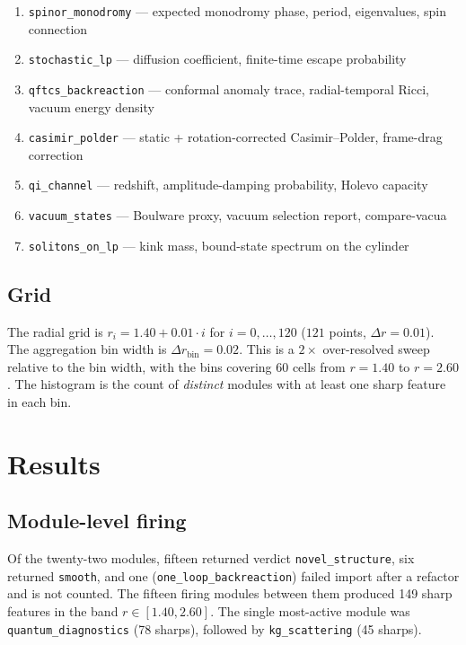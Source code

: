 \documentclass[11pt,letterpaper]{article}
\begin{document}
\begin{small}
\begin{enumerate}[leftmargin=*,itemsep=0pt]
\item \texttt{spinor\_monodromy} --- expected monodromy phase, period, eigenvalues, spin connection
\item \texttt{stochastic\_lp} --- diffusion coefficient, finite-time escape probability
\item \texttt{qftcs\_backreaction} --- conformal anomaly trace, radial-temporal Ricci, vacuum energy density
\item \texttt{casimir\_polder} --- static + rotation-corrected Casimir--Polder, frame-drag correction
\item \texttt{qi\_channel} --- redshift, amplitude-damping probability, Holevo capacity
\item \texttt{vacuum\_states} --- Boulware proxy, vacuum selection report, compare-vacua
\item \texttt{solitons\_on\_lp} --- kink mass, bound-state spectrum on the cylinder
\end{enumerate}
\end{small}

\subsection{Grid}

The radial grid is $r_i = 1.40 + 0.01 \cdot i$ for $i = 0, \ldots, 120$ ($121$ points, $\Delta r = 0.01$). The aggregation bin width is $\Delta r_{\mathrm{bin}} = 0.02$. This is a $2\times$ over-resolved sweep relative to the bin width, with the bins covering 60 cells from $r = 1.40$ to $r = 2.60$. The histogram is the count of \emph{distinct} modules with at least one sharp feature in each bin.

\section{Results}\label{sec:results}

\subsection{Module-level firing}

Of the twenty-two modules, fifteen returned verdict \texttt{novel\_structure}, six returned \texttt{smooth}, and one (\texttt{one\_loop\_backreaction}) failed import after a refactor and is not counted. The fifteen firing modules between them produced 149 sharp features in the band $r \in [1.40, 2.60]$. The single most-active module was \texttt{quantum\_diagnostics} (78 sharps), followed by \texttt{kg\_scattering} (45 sharps).
\end{document}
